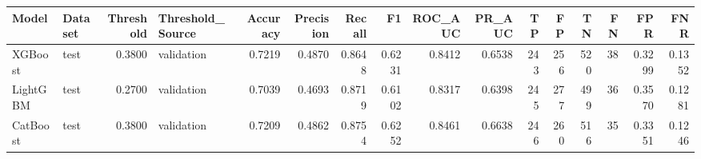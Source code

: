 \begin{tabular}{llrlrrrrrrrrrrrr}
\toprule
Model & Dataset & Threshold & Threshold_Source & Accuracy & Precision & Recall & F1 & ROC_AUC & PR_AUC & TP & FP & TN & FN & FPR & FNR \\
\midrule
XGBoost & test & 0.3800 & validation & 0.7219 & 0.4870 & 0.8648 & 0.6231 & 0.8412 & 0.6538 & 243 & 256 & 520 & 38 & 0.3299 & 0.1352 \\
LightGBM & test & 0.2700 & validation & 0.7039 & 0.4693 & 0.8719 & 0.6102 & 0.8317 & 0.6398 & 245 & 277 & 499 & 36 & 0.3570 & 0.1281 \\
CatBoost & test & 0.3800 & validation & 0.7209 & 0.4862 & 0.8754 & 0.6252 & 0.8461 & 0.6638 & 246 & 260 & 516 & 35 & 0.3351 & 0.1246 \\
\bottomrule
\end{tabular}
